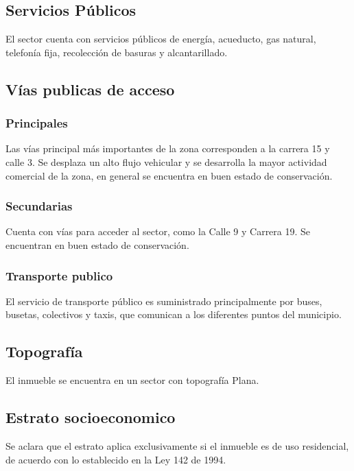 \documentclass[12pt,a4paper,twoside]{article}
\begin{document}
{\subsection{Servicios Públicos}

El sector cuenta con servicios públicos de energía, acueducto, gas natural, telefonía fija, recolección de basuras y alcantarillado.

\subsection{Vías publicas de acceso}

\subsubsection{Principales}

Las vías principal más importantes de la zona corresponden a la carrera 15 y calle 3.  Se desplaza un alto flujo vehicular y se desarrolla la mayor actividad comercial de la zona, en general se encuentra en buen estado de conservación.	

\subsubsection{Secundarias}

 Cuenta con vías para acceder al sector, como  la  Calle 9 y Carrera 19. Se encuentran en buen estado de conservación.

\subsubsection{Transporte publico}

El servicio de transporte público es suministrado principalmente por  buses, busetas, colectivos y taxis, que comunican a los diferentes puntos del municipio.

\subsection{Topografía}

El inmueble se encuentra en un sector con topografía Plana.%

\subsection{Estrato socioeconomico}

 Se aclara que el estrato aplica exclusivamente si el inmueble es de uso residencial, de acuerdo con lo establecido en la Ley 142 de 1994.

}
\end{document}
